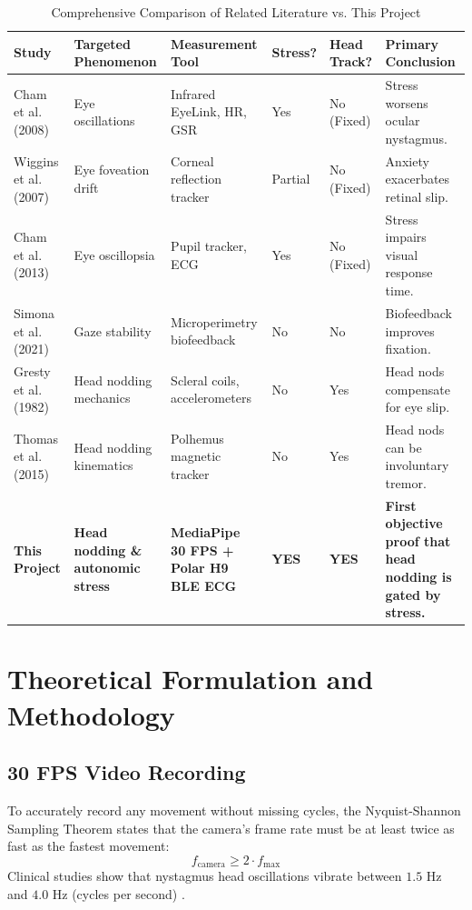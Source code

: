 \documentclass[12pt,a4paper,oneside]{report}
\begin{document}
\begin{table}[htbp]
\centering
\caption{Comprehensive Comparison of Related Literature vs. This Project}
\label{tab:literature_matrix}
\small
\begin{tabularx}{\textwidth}{@{} L{2.6cm} L{2.8cm} L{2.6cm} C{1.3cm} C{1.3cm} Y @{}}
\toprule
\textbf{Study} & \textbf{Targeted Phenomenon} & \textbf{Measurement Tool} & \textbf{Stress?} & \textbf{Head Track?} & \textbf{Primary Conclusion} \\
\midrule
Cham et al. (2008) \cite{cham2008} & Eye oscillations & Infrared EyeLink, HR, GSR & Yes & No (Fixed) & Stress worsens ocular nystagmus. \\
Wiggins et al. (2007) \cite{wiggins2007} & Eye foveation drift & Corneal reflection tracker & Partial & No (Fixed) & Anxiety exacerbates retinal slip. \\
Cham et al. (2013) \cite{cham2013} & Eye oscillopsia & Pupil tracker, ECG & Yes & No (Fixed) & Stress impairs visual response time. \\
Simona et al. (2021) \cite{simona2021} & Gaze stability & Microperimetry biofeedback & No & No & Biofeedback improves fixation. \\
Gresty et al. (1982) \cite{gresty1982} & Head nodding mechanics & Scleral coils, accelerometers & No & Yes & Head nods compensate for eye slip. \\
Thomas et al. (2015) \cite{thomas2015} & Head nodding kinematics & Polhemus magnetic tracker & No & Yes & Head nods can be involuntary tremor. \\
\midrule
\textbf{This Project} & \textbf{Head nodding \& autonomic stress} & \textbf{MediaPipe 30 FPS + Polar H9 BLE ECG} & \textbf{YES} & \textbf{YES} & \textbf{First objective proof that head nodding is gated by stress.} \\
\bottomrule
\end{tabularx}
\end{table}

\chapter{Theoretical Formulation and Methodology}
\label{chap:methodology}

\section{30 FPS Video Recording}
To accurately record any movement without missing cycles, the Nyquist-Shannon Sampling Theorem \cite{nyquist1928, shannon1949} states that the camera's frame rate must be at least twice as fast as the fastest movement:
\begin{equation}
    f_{\text{camera}} \ge 2 \cdot f_{\max}
\end{equation}
Clinical studies show that nystagmus head oscillations vibrate between $1.5\text{ Hz}$ and $4.0\text{ Hz}$ (cycles per second) \cite{gresty1982, thomas2015}. 
\end{document}
